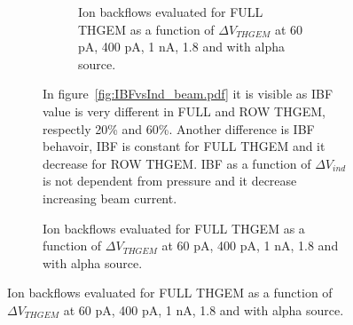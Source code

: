 \documentclass[a4paper, 11 pt]{article}
\newcommand{\Vind}{$\Delta V_{ind}$}
\newcommand{\Vthgem}{$\Delta V_{THGEM}$}
\begin{document}
\begin{figure}[htbp]
\begin{figure}[htbp]
\begin{figure}[!htb]
	\centering
	\caption{Ion backflows evaluated for FULL THGEM as a function of \Vthgem{} at 60 pA, 400 pA, 1 nA, 1.8 and with alpha source.}
	\label{fig:IBFvsTHGEM_beam_alpha}
\end{figure}



In figure~\ref{fig:IBFvsInd_beam.pdf} it is visible as IBF value is very different in FULL and ROW THGEM, respectly 20\% and 60\%. Another difference is IBF behavoir, IBF is constant for FULL THGEM and it decrease for ROW THGEM. IBF as a function of \Vind{} is not dependent from pressure and it decrease increasing beam current.


\end{figure}
\end{figure}
\end{document}

